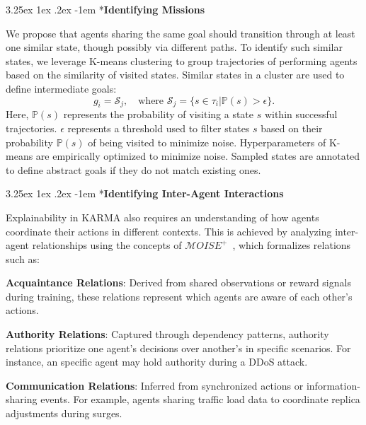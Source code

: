 \documentclass[conference]{IEEEtran}
\makeatletter
\renewcommand\paragraph{\@startsection{paragraph}{5}{\z@}%
  {3.25ex \@plus1ex \@minus.2ex}%
  {-1em}%
  {\normalfont\normalsize\bfseries}}
\makeatother
\begin{document}
\paragraph*{\textbf{Identifying Missions}}

We propose that agents sharing the same goal should transition through at least one similar state, though possibly via different paths. To identify such similar states, we leverage K-means clustering to group trajectories of performing agents based on the similarity of visited states. Similar states in a cluster are used to define intermediate goals:
\[
    g_i = \mathcal{S}_j, \quad \text{where } \mathcal{S}_j = \{s \in \tau_i | \mathbb{P}(s) > \epsilon\}.
\]
Here, $\mathbb{P}(s)$ represents the probability of visiting a state $s$ within successful trajectories. $\epsilon$ represents a threshold used to filter states $s$ based on their probability $\mathbb{P}(s)$ of being visited to minimize noise. Hyperparameters of K-means are empirically optimized to minimize noise. Sampled states are annotated to define abstract goals if they do not match existing ones.


\paragraph*{\textbf{Identifying Inter-Agent Interactions}}

Explainability in KARMA also requires an understanding of how agents coordinate their actions in different contexts. This is achieved by analyzing inter-agent relationships using the concepts of $\mathcal{M}OISE^+$~\cite{hubner2002moise}, which formalizes relations such as:
\begin{enumerate*}[label=\textbf{\arabic*)}, itemjoin={;\quad }]
    \item \textbf{Acquaintance Relations}: Derived from shared observations or reward signals during training, these relations represent which agents are aware of each other's actions.
    \item \textbf{Authority Relations}: Captured through dependency patterns, authority relations prioritize one agent's decisions over another's in specific scenarios. For instance, an specific agent may hold authority during a DDoS attack.
    \item \textbf{Communication Relations}: Inferred from synchronized actions or information-sharing events. For example, agents sharing traffic load data to coordinate replica adjustments during surges.
\end{enumerate*}
\end{document}
